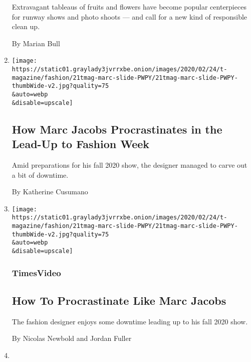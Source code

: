 \begin{enumerate}
  Extravagant tableaus of fruits and flowers have become popular
  centerpieces for runway shows and photo shoots --- and call for a new
  kind of responsible clean up.

  By Marian Bull
\item
  \href{/2020/02/21/t-magazine/marc-jacobs-procrastination.html}{}

  \texttt{[image: https://static01.graylady3jvrrxbe.onion/images/2020/02/24/t-magazine/fashion/21tmag-marc-slide-PWPY/21tmag-marc-slide-PWPY-thumbWide-v2.jpg?quality=75\\\&auto=webp\\\&disable=upscale]}

  \hypertarget{how-marc-jacobs-procrastinates-in-the-lead-up-to-fashion-week}{%
  \subsection{How Marc Jacobs Procrastinates in the Lead-Up to Fashion
  Week}\label{how-marc-jacobs-procrastinates-in-the-lead-up-to-fashion-week}}

  Amid preparations for his fall 2020 show, the designer managed to
  carve out a bit of downtime.

  By Katherine Cusumano
\item
  \href{/video/t-magazine/fashion/100000006992316/how-to-procrastinate-like-marc-jacobs.html}{}

  \texttt{[image: https://static01.graylady3jvrrxbe.onion/images/2020/02/24/t-magazine/fashion/21tmag-marc-slide-PWPY/21tmag-marc-slide-PWPY-thumbWide-v2.jpg?quality=75\\\&auto=webp\\\&disable=upscale]}

  \hypertarget{timesvideo}{%
  \subsubsection{TimesVideo}\label{timesvideo}}

  \hypertarget{how-to--procrastinate-like-marc-jacobs}{%
  \subsection{How To \textbar{} Procrastinate Like Marc
  Jacobs}\label{how-to--procrastinate-like-marc-jacobs}}

  The fashion designer enjoys some downtime leading up to his fall 2020
  show.

  By Nicolas Newbold and Jordan Fuller
\item
  \href{/2020/02/21/t-magazine/diane-von-furstenberg-talismans.html}{}


\end{enumerate}
